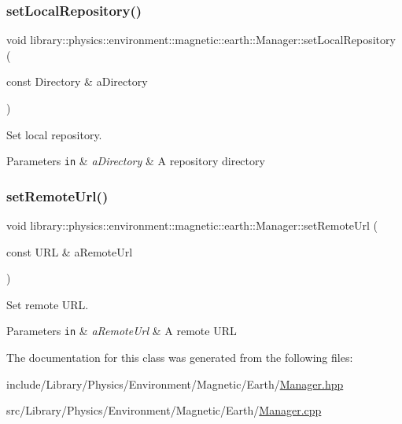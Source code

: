 \subsubsection{\texorpdfstring{set\+Local\+Repository()}{setLocalRepository()}}
{\footnotesize\ttfamily void library\+::physics\+::environment\+::magnetic\+::earth\+::\+Manager\+::set\+Local\+Repository (\begin{DoxyParamCaption}\item[{const Directory \&}]{a\+Directory }\end{DoxyParamCaption})}



Set local repository. 


\begin{DoxyParams}[1]{Parameters}
\mbox{\tt in}  & {\em a\+Directory} & A repository directory \\
\hline
\end{DoxyParams}
\mbox{\label{classlibrary_1_1physics_1_1environment_1_1magnetic_1_1earth_1_1_manager_a1c809eef5c24719dd852e63befdd6a64}} 
\subsubsection{\texorpdfstring{set\+Remote\+Url()}{setRemoteUrl()}}
{\footnotesize\ttfamily void library\+::physics\+::environment\+::magnetic\+::earth\+::\+Manager\+::set\+Remote\+Url (\begin{DoxyParamCaption}\item[{const U\+RL \&}]{a\+Remote\+Url }\end{DoxyParamCaption})}



Set remote U\+RL. 


\begin{DoxyParams}[1]{Parameters}
\mbox{\tt in}  & {\em a\+Remote\+Url} & A remote U\+RL \\
\hline
\end{DoxyParams}


The documentation for this class was generated from the following files\+:\begin{DoxyCompactItemize}
\item 
include/\+Library/\+Physics/\+Environment/\+Magnetic/\+Earth/\hyperlink{_environment_2_magnetic_2_earth_2_manager_8hpp}{Manager.\+hpp}\item 
src/\+Library/\+Physics/\+Environment/\+Magnetic/\+Earth/\hyperlink{_environment_2_magnetic_2_earth_2_manager_8cpp}{Manager.\+cpp}\end{DoxyCompactItemize}
